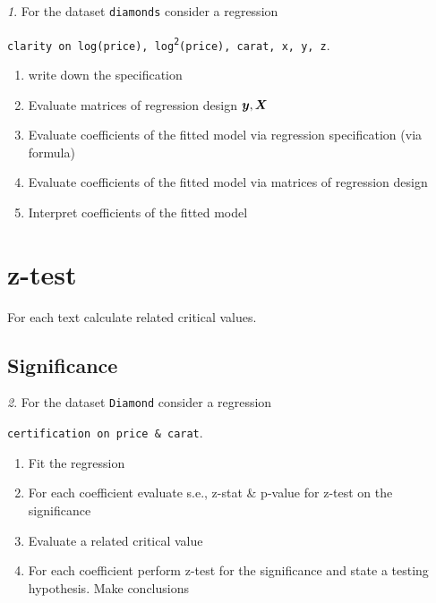 \documentclass[12pt]{article}
\theoremstyle{remark}
\newtheorem{problem}{}[section]
\begin{document}
\begin{problem}
For the dataset \texttt{diamonds} consider a regression
\begin{center}
	\texttt{clarity on log(price), log\textsuperscript{2}(price), carat, x, y, z}.
\end{center}
\begin{enumerate}
	\item write down the specification
	\item Evaluate matrices of regression design \({\bm y}, {\bm X}\)
	\item Evaluate coefficients of the fitted model via 
	regression specification (via formula)
	\item Evaluate coefficients of the fitted model via 
	matrices of regression design
	\item Interpret coefficients of the fitted model
\end{enumerate}
\end{problem}

\section{z-test}

For each text calculate related critical values.

\subsection{Significance}

\begin{problem}
For the dataset \texttt{Diamond} consider a regression
\begin{center}
	\texttt{certification on price \& carat}.
\end{center}
\begin{enumerate}
	\item Fit the regression
	\item For each coefficient evaluate s.e., z-stat \& p-value for z-test on the significance 
	\item Evaluate a related critical value
	\item For each coefficient perform z-test for the significance and state a testing hypothesis. 
	Make conclusions
\end{enumerate}
\end{problem}
\end{document}
